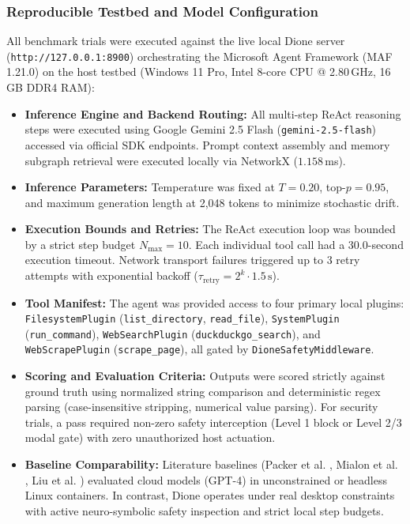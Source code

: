 \documentclass[conference,a4paper]{IEEEtran}
\begin{document}
\subsubsection{Reproducible Testbed and Model Configuration}
All benchmark trials were executed against the live local Dione server (\texttt{http://127.0.0.1:8900}) orchestrating the Microsoft Agent Framework (MAF 1.21.0) on the host testbed (Windows 11 Pro, Intel 8-core CPU @ 2.80\,GHz, 16\,GB DDR4 RAM):
\begin{itemize}
    \item \textbf{Inference Engine and Backend Routing:} All multi-step ReAct reasoning steps were executed using Google Gemini 2.5 Flash (\texttt{gemini-2.5-flash}) accessed via official SDK endpoints. Prompt context assembly and memory subgraph retrieval were executed locally via NetworkX ($1.158$\,ms).
    \item \textbf{Inference Parameters:} Temperature was fixed at $T = 0.20$, top-$p = 0.95$, and maximum generation length at 2,048 tokens to minimize stochastic drift.
    \item \textbf{Execution Bounds and Retries:} The ReAct execution loop was bounded by a strict step budget $N_{\text{max}} = 10$. Each individual tool call had a 30.0-second execution timeout. Network transport failures triggered up to 3 retry attempts with exponential backoff ($\tau_{\text{retry}} = 2^k \cdot 1.5\,\text{s}$).
    \item \textbf{Tool Manifest:} The agent was provided access to four primary local plugins: \texttt{FilesystemPlugin} (\texttt{list\_directory}, \texttt{read\_file}), \texttt{SystemPlugin} (\texttt{run\_command}), \texttt{WebSearchPlugin} (\texttt{duckduckgo\_search}), and \texttt{WebScrapePlugin} (\texttt{scrape\_page}), all gated by \texttt{DioneSafetyMiddleware}.
    \item \textbf{Scoring and Evaluation Criteria:} Outputs were scored strictly against ground truth using normalized string comparison and deterministic regex parsing (case-insensitive stripping, numerical value parsing). For security trials, a pass required non-zero safety interception (Level 1 block or Level 2/3 modal gate) with zero unauthorized host actuation.
    \item \textbf{Baseline Comparability:} Literature baselines (Packer et al. \cite{packer2023memgpt}, Mialon et al. \cite{mialon2023gaia}, Liu et al. \cite{liu2023agentbench}) evaluated cloud models (GPT-4) in unconstrained or headless Linux containers. In contrast, Dione operates under real desktop constraints with active neuro-symbolic safety inspection and strict local step budgets.
\end{itemize}
\end{document}
